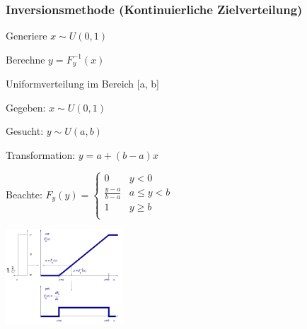\subsubsection{Inversionsmethode (Kontinuierliche Zielverteilung)}
\begin{compactenum}
	\item Generiere $x\sim U(0, 1)$
	\item Berechne $y = F_y^{-1}(x)$ 
\end{compactenum}
\begin{example}
	Uniformverteilung im Bereich [a, b] 
	\begin{multicols}{2}
		\begin{compactitem}
			\item Gegeben: $x\sim U(0, 1)$
			\item Gesucht: $y\sim U(a, b)$
			\item Transformation: $y = a+(b-a)x$
			\item Beachte: $F_y(y) = \left\{\begin{array}{ll}
												0 & y < 0 \\
												\frac{y-a}{b-a} & a \leq y < b \\
												1 & y \geq b \\
											\end{array}\right.$
		\end{compactitem}
		\includegraphics[width=0.33\textwidth]{pictures/inversionsmethode} 
	\end{multicols}
\end{example}

